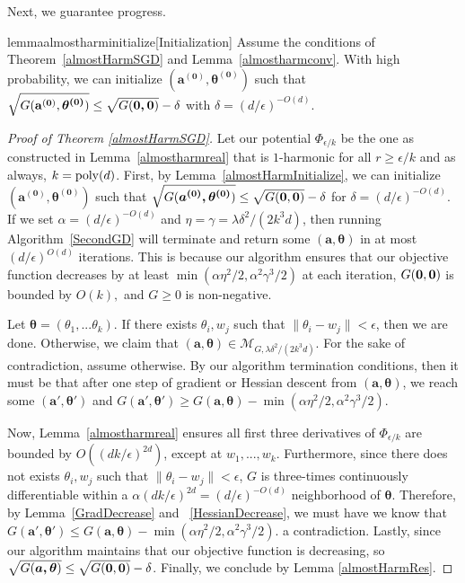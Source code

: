  Next, we guarantee progress.
 \begin{restatable}{lemma}{almostharminitialize}[Initialization]\label{almostHarmInitialize}
Assume the conditions of Theorem~\ref{almostHarmSGD} and Lemma~\ref{almostharmconv}. With high probability, we can initialize $\boldsymbol{(a^{(0)},\theta^{(0)})}$ such that $\sqrt{G({\bf a^{(0)}}, \boldsymbol{\theta^{(0)}})} \leq \sqrt{G(\boldsymbol{0,0})} -\delta$ with $\delta = (d/\epsilon)^{ - O(d)}$.
 \end{restatable}
\begin{proof}[Proof of Theorem \ref{almostHarmSGD}]
  Let our potential $\Phi_{\epsilon/k}$ be the one as constructed in Lemma~\ref{almostharmreal} that is $1$-harmonic for all $r \geq \epsilon/k$ and as always, $k = \mathrm{poly}(d)$.  First, by Lemma~\ref{almostHarmInitialize}, we can initialize $\boldsymbol{(a^{(0)},\theta^{(0)})}$ such that $\sqrt{G(\boldsymbol{a^{(0)},\theta^{(0)}})} \leq \sqrt{G({\bf 0,0})} - \delta$ for $\delta = (d/\epsilon)^{-O(d)}$. If we set $\alpha = (d/\epsilon)^{-O(d)}$ and $\eta = \gamma = \lambda \delta^2/(2k^3d)$, then running Algorithm~\ref{SecondGD} will terminate and return some $(\boldsymbol{a,\theta})$ in at most $(d/\epsilon)^{O(d)}$ iterations. This is because our algorithm ensures that our objective function decreases by at least $\min(\alpha \eta^2/2, \alpha^2\gamma^3/2)$ at each iteration, $G({\bf 0, 0})$ is bounded by $O(k),$ and $G \geq 0$ is non-negative.

Let $\boldsymbol{\theta} = (\theta_1,...\theta_k)$. If there exists $\theta_i, w_j$ such that $\|\theta_i - w_j\| < \epsilon$, then we are done. Otherwise, we claim that $(\boldsymbol{a,\theta}) \in \mathcal{M}_{G,\lambda \delta^2/(2k^3d)}$. For the sake of contradiction, assume otherwise. By our algorithm termination conditions, then it must be that after one step of gradient or Hessian descent from $(\boldsymbol{a,\theta})$, we reach some $(\boldsymbol{a',\theta'})$ and $G(\boldsymbol{a',\theta'}) \geq G(\boldsymbol{a,\theta}) - \min(\alpha\eta^2/2,\alpha^2\gamma^3/2)$.

Now, Lemma~\ref{almostharmreal} ensures all first three derivatives of $\Phi_{\epsilon/k}$ are bounded by $O((dk/\epsilon)^{2d})$, except at $w_1,...,w_k$. Furthermore, since there does not exists $\theta_i, w_j$ such that $\|\theta_i - w_j\| <\epsilon$, $G$ is three-times continuously differentiable within a $\alpha (dk/\epsilon)^{2d} = (d/\epsilon)^{-O(d)}$ neighborhood of $\boldsymbol{\theta}$. Therefore, by Lemma~\ref{GradDecrease} and ~\ref{HessianDecrease}, we must have  we know that $G(\boldsymbol{a',\theta'}) \leq G(\boldsymbol{a,\theta}) - \min(\alpha\eta^2/2,\alpha^2\gamma^3/2)$. a contradiction. Lastly, since our algorithm maintains that our objective function is decreasing, so $\sqrt{G(\boldsymbol{a,\theta})} \leq \sqrt{G({\bf 0,0})} - \delta$. Finally, we conclude by Lemma \ref{almostHarmRes}.
\end{proof}

